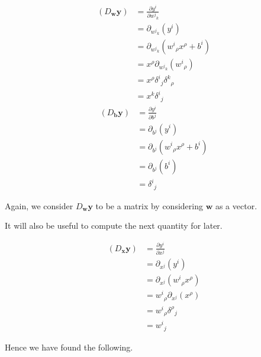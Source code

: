 \documentclass[a4paper]{article}
\theoremstyle{plain} %
\theoremstyle{definition} %
\numberwithin{equation}{subsection}
\newcommand{\del}[2]{\frac{\partial #1}{\partial #2}}
\newcommand{\vx}{{\textbf{x}}}
\newcommand{\vy}{{\textbf{y}}}
\newcommand{\vw}{{\textbf{w}}}
\newcommand{\vb}{{\textbf{b}}}
\begin{document}
\begin{align*}  
  (D_\vw \vy) &=  \del{y^i}{{w^j}_k} \\
   &= \partial_{{w^j}_k} (y^i) \tag{shorthand for partial derivative}\\
   &= \partial_{{w^j}_k} ({w^i}_\rho x^\rho + b^i) \tag{substituting $y$ definition}\\
   &= x^\rho \partial_{{w^j}_k} ({w^i}_\rho) \tag{linearity of partial derivative}\\
   &= x^\rho {\delta^i}_j {\delta^k}_\rho \tag{independence of variables}\\
   &= x^k {\delta^i}_j \tag{summing over Kronecker delta}
\end{align*}
\begin{align*}  
  (D_\vb \vy) &=  \del{y^i}{{b^j}} \\
   &= \partial_{{b^j}} (y^i) \tag{shorthand for partial derivative}\\
   &= \partial_{{b^j}} ({w^i}_\rho x^\rho + b^i) \tag{substituting $y$ definition}\\
   &= \partial_{{b^j}} ({b^i}) \tag{linearity of partial derivative}\\
   &= {\delta^i}_j 
\end{align*}

Again, we consider $D_\vw \vy$ to be a matrix by considering $\vw$ as a vector.

It will also be useful to compute the next quantity for later.

\begin{align*}
  (D_\vx \vy) &=   \del{y^i}{{x^j}} \\
   &= \partial_{{x^j}} (y^i) \tag{shorthand for partial derivative}\\
   &= \partial_{{x^j}} ({w^i}_\rho x^\rho) \tag{substituting $y$ definition}\\
   &= {w^i}_\rho\partial_{{x^j}}(x^\rho)  \tag{linearity of partial derivative}\\
   &= {w^i}_\rho {\delta^\rho}_j \tag{independence of variables}\\
   &= {w^i}_j \tag{summing over Kronecker delta}
\end{align*}

Hence we have found the following.
\end{document}
